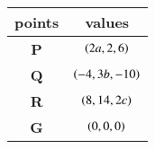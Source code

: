 \begin{tabular}{|c|c|}
\hline
\textbf{points} & \textbf{values}\\
\hline
\textbf{P} & $\left(2a,2,6\right)$\\
\hline
\textbf{Q} & $\left(-4,3b,-10\right)$\\
\hline
\textbf{R} & $\left(8,14,2c\right)$\\
\hline
\textbf{G} & $\left(0,0,0\right)$\\
\hline
\end{tabular}
